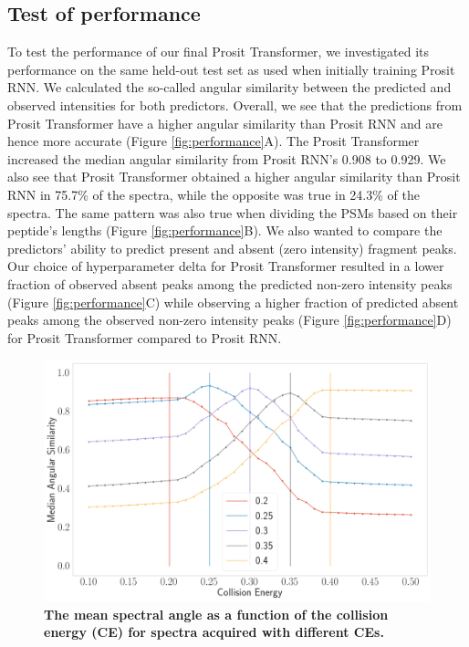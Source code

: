 \documentclass[10pt,a4paper]{article}
\begin{document}
\subsection*{Test of performance}
    

To test the performance of our final Prosit Transformer, we investigated its performance on the same held-out test set as used when initially training Prosit RNN. We calculated the so-called angular similarity between the predicted and observed intensities for both predictors. Overall, we see that the predictions from Prosit Transformer have a higher angular similarity than Prosit RNN and are hence more accurate (Figure \ref{fig:performance}A). The Prosit Transformer increased the median angular similarity from Prosit RNN’s 0.908 to 0.929. We also see that Prosit Transformer obtained a higher angular similarity than Prosit RNN in 75.7\% of the spectra, while the opposite was true in 24.3\% of the spectra. The same pattern was also true when dividing the PSMs based on their peptide’s lengths (Figure \ref{fig:performance}B). We also wanted to compare the predictors’ ability to predict present and absent (zero intensity) fragment peaks.  Our choice of hyperparameter delta for Prosit Transformer resulted in a lower fraction of observed absent peaks among the predicted non-zero intensity peaks (Figure \ref{fig:performance}C) while observing a higher fraction of predicted absent peaks among the observed non-zero intensity peaks (Figure \ref{fig:performance}D) for Prosit Transformer compared to Prosit RNN.



\begin{figure}[ht!]
    \centering
    \includegraphics[width=12cm]{./img/ce_calibration.png}
    \caption{{\bf The mean spectral angle as a function of the collision energy (CE) for spectra acquired with different CEs.}\label{fig:ce}}
    \end{figure}
\end{document}
